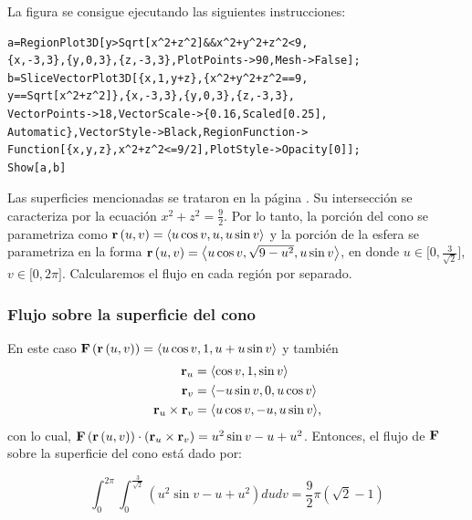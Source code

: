\begin{parrafonumerado}
La figura se consigue ejecutando las siguientes instrucciones:

\begin{tcolorbox}[title=\bf Instrucción \verb"Mathematica"]\begin{Verbatim}[formatcom=\letraverbatim]
a=RegionPlot3D[y>Sqrt[x^2+z^2]&&x^2+y^2+z^2<9,
{x,-3,3},{y,0,3},{z,-3,3},PlotPoints->90,Mesh->False];
b=SliceVectorPlot3D[{x,1,y+z},{x^2+y^2+z^2==9,
y==Sqrt[x^2+z^2]},{x,-3,3},{y,0,3},{z,-3,3},
VectorPoints->18,VectorScale->{0.16,Scaled[0.25],
Automatic},VectorStyle->Black,RegionFunction->
Function[{x,y,z},x^2+z^2<=9/2],PlotStyle->Opacity[0]];
Show[a,b]
\end{Verbatim}
\end{tcolorbox}

Las superficies mencionadas se trataron en la página \pageref{ejercicio7a}.
Su intersección se caracteriza por la ecuación
$x^{2}+z^{2}=\frac{9}{2}$. Por lo tanto, la porción del cono se parametriza como
${\bf r}\left( u,v\right) =\left\langle u\cos v,u,u\sin v\right\rangle $
y la porción de la esfera se parametriza en la forma
${\bf r}\left(u,v\right) =\left\langle u\cos v,\sqrt{9-u^{2}},u\sin v\right\rangle $, en donde $u\in \lbrack 0,\frac{3}{\sqrt{2}}]$, $v\in \lbrack 0,2\pi ]$.
Calcularemos el flujo en cada región por separado.

\subsubsection{Flujo sobre la superficie del cono}

En este caso ${\bf F}\left( {\bf r}\left( u,v\right) \right) =\left\langle u\cos v,1,u+u\sin v\right\rangle $
y también
\begin{align*}
{\bf r}_{u} &= \left\langle \cos v, 1, \sin v \right\rangle \\
{\bf r}_{v} &=\left\langle -u\sin v,0,u\cos v\right\rangle \\
{\bf r}_{u}\times {\bf r}_{v}&= \left\langle u\cos v,-u,u\sin v\right\rangle\!,
\end{align*}
con lo cual,
${\bf F}\left({\bf r}\left(u,v\right)\right)\cdot \left({\bf r}_{u}\times {\bf r}_{v}\right) = u^{2}\sin v-u+u^{2}$.
Entonces, el flujo de ${\bf F}$ sobre la superficie del cono está dado por:

\begin{equation}
\label{flujo9}
\int_{0}^{2\pi}\int_0^{\frac{3}{\sqrt{2}}}\left(u^{2}\sin v-u+u^{2}\right)dudv= \frac{9}{2}\pi \left( \sqrt{2}-1\right)
\end{equation}


\end{parrafonumerado}
